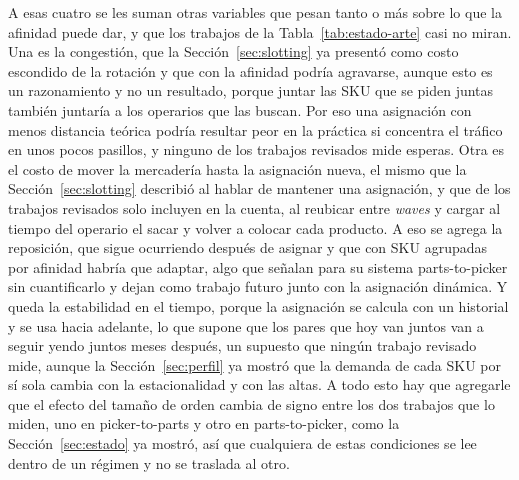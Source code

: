 A esas cuatro se les suman otras variables que pesan tanto o más sobre lo que la afinidad puede dar, y que los trabajos de la Tabla~\ref{tab:estado-arte} casi no miran.
Una es la congestión, que la Sección~\ref{sec:slotting} ya presentó como costo escondido de la rotación y que con la afinidad podría agravarse, aunque esto es un razonamiento y no un resultado, porque juntar las SKU que se piden juntas también juntaría a los operarios que las buscan.
Por eso una asignación con menos distancia teórica podría resultar peor en la práctica si concentra el tráfico en unos pocos pasillos, y ninguno de los trabajos revisados mide esperas.
Otra es el costo de mover la mercadería hasta la asignación nueva, el mismo que la Sección~\ref{sec:slotting} describió al hablar de mantener una asignación, y que de los trabajos revisados solo \citet{xu2020dynamic} incluyen en la cuenta, al reubicar entre \emph{waves} y cargar al tiempo del operario el sacar y volver a colocar cada producto.
A eso se agrega la reposición, que sigue ocurriendo después de asignar y que con SKU agrupadas por afinidad habría que adaptar, algo que \citet{mirzaei2021integrated} señalan para su sistema parts-to-picker sin cuantificarlo y dejan como trabajo futuro junto con la asignación dinámica.
Y queda la estabilidad en el tiempo, porque la asignación se calcula con un historial y se usa hacia adelante, lo que supone que los pares que hoy van juntos van a seguir yendo juntos meses después, un supuesto que ningún trabajo revisado mide, aunque la Sección~\ref{sec:perfil} ya mostró que la demanda de cada SKU por sí sola cambia con la estacionalidad y con las altas.
A todo esto hay que agregarle que el efecto del tamaño de orden cambia de signo entre los dos trabajos que lo miden, uno en picker-to-parts y otro en parts-to-picker, como la Sección~\ref{sec:estado} ya mostró, así que cualquiera de estas condiciones se lee dentro de un régimen y no se traslada al otro.

